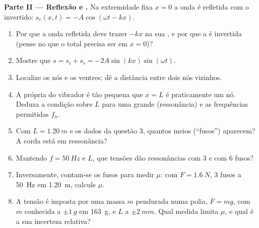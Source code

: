 \begin{problem}
\medskip
\noindent\textbf{Parte II --- Reflexão e .}
Na extremidade fixa $x = 0$ a onda é refletida com o  invertido:
$s_r(x, t) = -A\cos(\omega t - kx)$.
\begin{enumerate}[resume]
  \item Por que a onda refletida deve trazer $-kx$ na sua , e por que
        a  é invertida (pense no que o  total precisa ser
        em $x = 0$)?
  \item Mostre que $s = s_i + s_r = -2A\sin(kx)\sin(\omega t)$.
  \item Localize os nós e os ventres; dê a distância entre dois
        nós vizinhos.
  \item A  própria do vibrador é tão pequena que $x = L$ é
        praticamente um nó. Deduza a condição sobre $L$ para uma grande
         (ressonância) e as frequências permitidas $f_n$.
  \item Com $L = \qty{1.20}{m}$ e os dados da questão 3, quantos
        meios  (``fusos'') aparecem? A corda está em
        ressonância?
  \item Mantendo $f = \qty{50}{Hz}$ e $L$, que tensões dão
        ressonâncias com $3$ e com $6$ fusos?
  \item Inversamente, contam-se os fusos para medir $\mu$: com
        $F = \qty{1.6}{N}$, $3$ fusos a \qty{50}{Hz} em \qty{1.20}{m},
        calcule $\mu$.
  \item A tensão é imposta por uma massa $m$ pendurada numa polia,
        $F = mg$, com $m$ conhecida a $\pm\qty{1}{g}$ em \qty{163}{g}, e
        $L$ a $\pm\qty{2}{mm}$. Qual medida limita $\mu$, e
        qual é a sua incerteza relativa?
\end{enumerate}


\end{problem}
